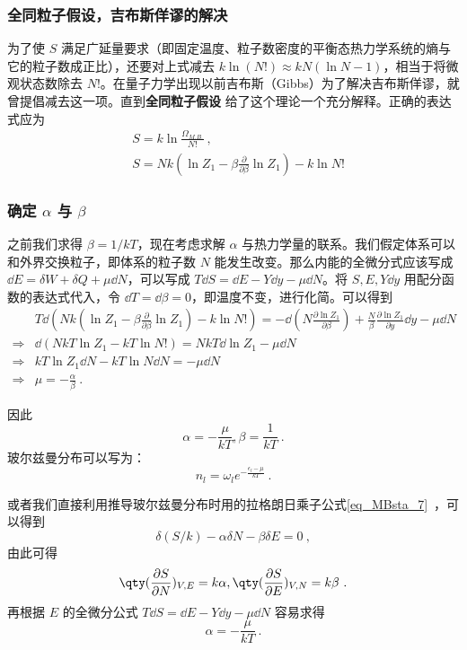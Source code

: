 \subsubsection{全同粒子假设，吉布斯佯谬的解决}
为了使 $S$ 满足广延量要求（即固定温度、粒子数密度的平衡态热力学系统的熵与它的粒子数成正比），还要对上式减去 $k\ln (N!)\approx k N(\ln N-1)$，相当于将微观状态数除去 $N!$。在量子力学出现以前吉布斯（Gibbs）为了解决吉布斯佯谬，就曾提倡减去这一项。直到\textbf{全同粒子假设} 给了这个理论一个充分解释。正确的表达式应为
\begin{equation}\label{eq_TheSta_5}
\begin{aligned}
&S=k\ln \frac{\Omega_{M.B.}}{N!}~,\\
&S=Nk(\ln Z_1-\beta\frac{\partial }{\partial \beta}\ln Z_1)-k\ln N!
\end{aligned}
\end{equation}
\subsubsection{确定 $\alpha$ 与 $\beta$}
之前我们求得 $\beta=1/kT$，现在考虑求解 $\alpha$ 与热力学量的联系。我们假定体系可以和外界交换粒子，即体系的粒子数 $N$ 能发生改变。那么内能的全微分式应该写成 $\dd E=\delta W+\delta Q+\mu\dd N$，可以写成 $T\dd S=\dd E-Y\dd y-\mu\dd N$。将 $S,E,Y\dd y$ 用配分函数的表达式代入，令 $\dd T=\dd \beta=0$，即温度不变，进行化简。可以得到
\begin{equation}
\begin{aligned}
&T\dd(Nk(\ln Z_1-\beta\frac{\partial }{\partial \beta}\ln Z_1)-k\ln N!)=-\dd(N \frac{\partial \ln Z_1}{\partial \beta})+\frac{N}{\beta}\frac{\partial \ln Z_1}{\partial y}\dd y-\mu\dd N\\
\Rightarrow &\dd(NkT\ln Z_1-kT\ln N!)=NkT \dd \ln Z_1 -\mu \dd N\\
\Rightarrow & kT\ln Z_1 \dd N-kT\ln N\dd N=-\mu\dd N\\
\Rightarrow &\mu=-\frac{\alpha}{\beta}~.
\end{aligned}
\end{equation}

因此
\begin{equation}
\alpha=-\frac{\mu}{kT},\beta=\frac{1}{kT}~.
\end{equation}
玻尔兹曼分布可以写为：
\begin{equation}
n_l=\omega_l e^{-\frac{\epsilon_l-\mu}{kT}}~.
\end{equation}

或者我们直接利用推导玻尔兹曼分布时用的拉格朗日乘子公式\autoref{eq_MBsta_7}~，可以得到
\begin{equation}
\delta(S/k)-\alpha \delta N-\beta \delta E=0~,
\end{equation}
由此可得
\begin{equation}
\qty(\frac{\partial S}{\partial N})_{V,E}=k\alpha,\qty(\frac{\partial S}{\partial E})_{V,N}=k\beta~.
\end{equation}
再根据 $E$ 的全微分公式 $T\dd S=\dd E-Y\dd y-\mu\dd N$ 容易求得
\begin{equation}
\alpha=-\frac{\mu}{kT}~.
\end{equation}

